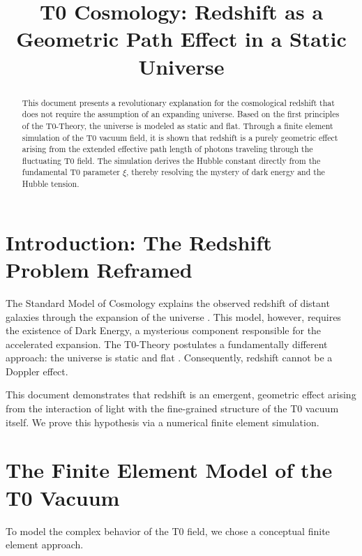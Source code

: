 \documentclass[12pt,a4paper]{report}
\begin{document}
\hfuzz=200pt

\title{\textbf{T0 Cosmology: Redshift as a Geometric Path Effect in a Static Universe}}
\maketitle

\thispagestyle{fancy}
	
	\begin{abstract}
		This document presents a revolutionary explanation for the cosmological redshift that does not require the assumption of an expanding universe. Based on the first principles of the T0-Theory, the universe is modeled as static and flat. Through a finite element simulation of the T0 vacuum field, it is shown that redshift is a purely geometric effect arising from the extended effective path length of photons traveling through the fluctuating T0 field. The simulation derives the Hubble constant directly from the fundamental T0 parameter $\xi$, thereby resolving the mystery of dark energy and the Hubble tension.
	\end{abstract}
	
	\tableofcontents
	
	\section{Introduction: The Redshift Problem Reframed}
	
	The Standard Model of Cosmology explains the observed redshift of distant galaxies through the expansion of the universe \cite{planck2018}. This model, however, requires the existence of Dark Energy, a mysterious component responsible for the accelerated expansion. The T0-Theory postulates a fundamentally different approach: the universe is static and flat \cite{pascher:t0_foundations}. Consequently, redshift cannot be a Doppler effect.
	
	This document demonstrates that redshift is an emergent, geometric effect arising from the interaction of light with the fine-grained structure of the T0 vacuum itself. We prove this hypothesis via a numerical finite element simulation.
	
	\section{The Finite Element Model of the T0 Vacuum}
	
	To model the complex behavior of the T0 field, we chose a conceptual finite element approach.
	
\end{document}
